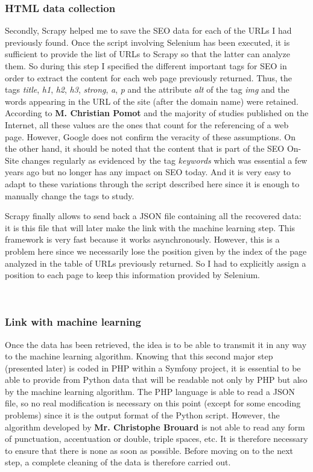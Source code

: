 \documentclass[12pt]{article}
\begin{document}
\subsubsection{HTML data collection}
 
Secondly, \textsf{Scrapy} helped me to save the SEO data for each of the URLs I had previously found. Once the script involving \textsf{Selenium} has been executed, it is sufficient to provide the list of URLs to \textsf{Scrapy} so that the latter can analyze them. So during this step I specified the different important tags for SEO in order to extract the content for each web page previously returned. Thus, the tags \textit{title}, \textit{h1}, \textit{h2}, \textit{h3}, \textit{strong}, \textit{a}, \textit{p} and the attribute \textit{alt} of the tag \textit{img} and the words appearing in the URL of the site (after the domain name) were retained. According to \textbf{M. Christian Pomot} and the majority of studies published on the Internet, all these values are the ones that count for the referencing of a web page. However, Google does not confirm the veracity of these assumptions. On the other hand, it should be noted that the content that is part of the SEO On-Site changes regularly as evidenced by the tag \textit{keywords} which was essential a few years ago but no longer has any impact on SEO today. And it is very easy to adapt to these variations through the script described here since it is enough to manually change the tags to study. 
\

\textsf{Scrapy} finally allows to send back a \textsf{JSON}  file containing all the recovered data: it is this file that will later make the link with the machine learning step. This framework is very fast because it works asynchronously. However, this is a problem here since we necessarily lose the position given by the index of the page analyzed in the table of URLs previously returned. So I had to explicitly assign a position to each page to keep this information provided by \textsf{Selenium}.

\

\subsubsection{Link with machine learning}

Once the data has been retrieved, the idea is to be able to transmit it in any way to the machine learning algorithm. Knowing that this second major step (presented later) is coded in \textsf{PHP} within a \textsf{Symfony} project, it is essential to be able to provide from \textsf{Python} data that will be readable not only by \textsf{PHP} but also by the machine learning algorithm. The \textsf{PHP} language is able to read a \textsf{JSON} file, so no real modification is necessary on this point (except for some encoding problems) since it is the output format of the \textsf{Python} script. However, the algorithm developed by \textbf{Mr. Christophe Brouard} is not able to read any form of punctuation, accentuation or double, triple spaces, etc. It is therefore necessary to ensure that there is none as soon as possible. Before moving on to the next step, a complete cleaning of the data is therefore carried out.
\end{document}
